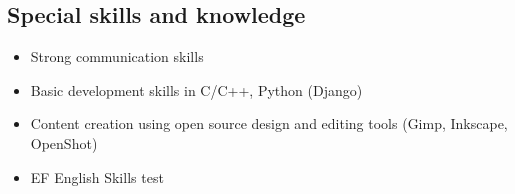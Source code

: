 \documentclass[overlapped,line,final]{../../templates/MichaelDeCorteCV/lib/res}
\begin{document}
\begin{resume}
\section{\sc Special skills and knowledge}
\vspace{0.5cm}
\begin{itemize}
	\item Strong communication skills
	\item Basic development skills in C/C++, Python (Django)
 	\item Content creation using open source design and editing tools (Gimp, Inkscape, OpenShot)
	\item EF English Skills test \href{https://raw.githubusercontent.com/dtorot/NemqCV/profile-engineer/latex/docs/efTest2021.pdf}{}
\end{itemize}


\end{resume}
\end{document}
